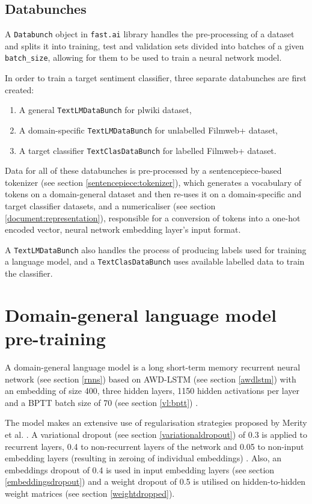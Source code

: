 \subsection{Databunches}

A \lstinline{Databunch} object in \lstinline{fast.ai} library handles the pre-processing of a dataset and splits it into training, test and validation sets divided into batches of a given \lstinline{batch_size}, allowing for them to be used to train a neural network model.

In order to train a target sentiment classifier, three separate databunches are first created:

\begin{enumerate}
\item A general \lstinline{TextLMDataBunch} for plwiki dataset,
\item A domain-specific \lstinline{TextLMDataBunch} for unlabelled Filmweb+ dataset,
\item A target classifier \lstinline{TextClasDataBunch} for labelled Filmweb+ dataset.
\end{enumerate}

Data for all of these databunches is pre-processed by a sentencepiece-based tokenizer (see section \ref{sentencepiece:tokenizer}), which generates a vocabulary of tokens on a domain-general dataset and then re-uses it on a domain-specific and target classifier datasets, and a numericaliser (see section \ref{document:representation}), responsible for a conversion of tokens into a one-hot encoded vector, neural network embedding layer's input format.

A \lstinline{TextLMDataBunch} also handles the process of producing labels used for training a language model, and a \lstinline{TextClasDataBunch} uses available labelled data to train the classifier.

\section{Domain-general language model pre-training}

A domain-general language model is a long short-term memory recurrent neural network (see section \ref{rnns}) based on AWD-LSTM (see section \ref{awdlstm}) with an embedding of size 400, three hidden layers, 1150 hidden activations per layer and a BPTT batch size of 70 (see section \ref{vl:bptt}) \cite{ulmfit}. 

The model makes an extensive use of regularisation strategies proposed by Merity et al. \cite{merity:awdlstm}. A variational dropout (see section \ref{variationaldropout}) of 0.3 is applied to recurrent layers, 0.4 to non-recurrent layers of the network and 0.05 to non-input embedding layers (resulting in zeroing of individual embeddings) . Also, an embeddings dropout of 0.4 is used in input embedding layers (see section \ref{embeddingsdropout}) and a weight dropout of 0.5 is utilised on hidden-to-hidden weight matrices (see section \ref{weightdropped}). 

